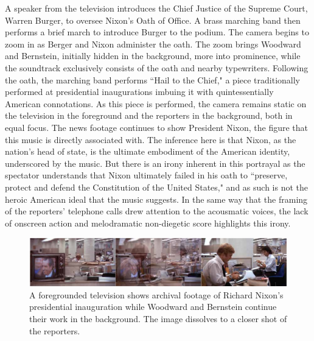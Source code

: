 A speaker from the television introduces the Chief Justice of the Supreme Court, Warren Burger, to oversee Nixon's Oath of Office.
A brass marching band then performs a brief march to introduce Burger to the podium.
The camera begins to zoom in as Berger and Nixon administer the oath.
The zoom brings Woodward and Bernstein, initially hidden in the background, more into prominence, while the soundtrack exclusively consists of the oath and nearby typewriters.
Following the oath, the marching band performs ``Hail to the Chief," a piece traditionally performed at presidential inaugurations imbuing it with quintessentially American connotations.
As this piece is performed, the camera remains static on the television in the foreground and the reporters in the background, both in equal focus.
The news footage continues to show President Nixon, the figure that this music is directly associated with.
The inference here is that Nixon, as the nation's head of state, is the ultimate embodiment of the American identity, underscored by the music.
But there is an irony inherent in this portrayal as the spectator understands that Nixon ultimately failed in his oath to ``preserve, protect and defend the Constitution of the United States," and as such is not the heroic American ideal that the music suggests.
In the same way that the framing of the reporters' telephone calls drew attention to the acousmatic voices, the lack of onscreen action and melodramatic non-diegetic score highlights this irony.

\begin{figure}
    \centering
    \includegraphics[width=1\linewidth]{img/president-hail-dissolve.pdf}
    \caption{A foregrounded television shows archival footage of Richard Nixon's presidential inauguration while Woodward and Bernstein continue their work in the background. The image dissolves to a closer shot of the reporters.}
    \label{fig:president-hail-dissolve}
\end{figure}


